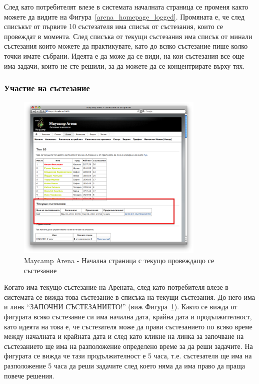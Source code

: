 \documentclass[a4paper,12pt]{article}
\begin{document}
  След като потребителят влезе в системата началната страница се променя както можете да видите на Фигура~\ref{arena_homepage_logged}. Промяната е, че след списъкът от първите 10 състезателя има списък от състезания, които се провеждат в момента. След списъка от текущи състезания има списък от минали състезания които можете да практикувате, като до всяко състезание пише колко точки имате събрани. Идеята е да може да се види, на кои състезания все още има задачи, които не сте решили, за да можете да се концентрирате върху тях.
  
  \pagebreak

  \subsubsection{Участие на състезание}
  
  \begin{figure}[ht]
    \begin{center}
      \includegraphics[width=0.8\textwidth]{images/maycamp_arena_home_contest.png}
    \end{center}
    \caption{Maycamp Arena - Начална страница с текущо провеждащо се състезание}
    \label{arena_homepage_contest}
  \end{figure}
  
  Когато има текущо състезание на Арената, след като потребителя влезе в системата се вижда това състезание в списъка на текущи състезания. До него има и линк ``ЗАПОЧНИ СЪСТЕЗАНИЕТО!'' (виж Фигура~\ref{arena_homepage_contest}). Както се вижда от фигурата всяко състезание си има начална дата, крайна дата и продължителност, като идеята на това е, че състезателя може да прави състезанието по всяко време между началната и крайната дата и след като кликне на линка за започване на състезанието ще има на разположение определено време за да реши задачите. На фигурата се вижда че тази продължителност е 5 часа, т.е. състезателя ще има на разположение 5 часа да реши задачите след което няма да има право да праща повече решения.
  
\end{document}

